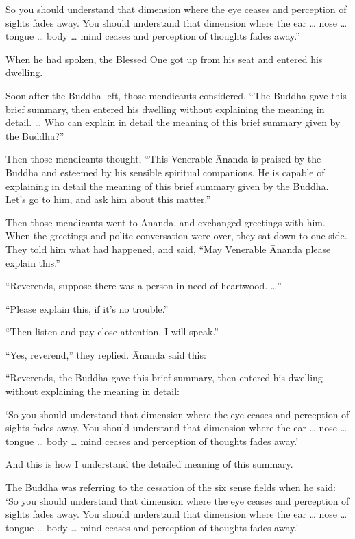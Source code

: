 \documentclass[12pt,openany]{book}%
\begin{document}
So you should understand that dimension where the eye ceases and perception of sights fades away. You should understand that dimension where the ear … nose … tongue … body … mind ceases and perception of thoughts fades away.” 

When he had spoken, the Blessed One got up from his seat and entered his dwelling. 

Soon after the Buddha left, those mendicants considered, “The Buddha gave this brief summary, then entered his dwelling without explaining the meaning in detail. … Who can explain in detail the meaning of this brief summary given by the Buddha?” 

Then those mendicants thought, “This Venerable Ānanda is praised by the Buddha and esteemed by his sensible spiritual companions. He is capable of explaining in detail the meaning of this brief summary given by the Buddha. Let’s go to him, and ask him about this matter.” 

Then those mendicants went to Ānanda, and exchanged greetings with him. When the greetings and polite conversation were over, they sat down to one side. They told him what had happened, and said, “May Venerable Ānanda please explain this.” 

“Reverends, suppose there was a person in need of heartwood. …” 

“Please explain this, if it’s no trouble.” 

“Then listen and pay close attention, I will speak.” 

“Yes, reverend,” they replied. Ānanda said this: 

“Reverends, the Buddha gave this brief summary, then entered his dwelling without explaining the meaning in detail: 

‘So you should understand that dimension where the eye ceases and perception of sights fades away. You should understand that dimension where the ear … nose … tongue … body … mind ceases and perception of thoughts fades away.’ 

And this is how I understand the detailed meaning of this summary. 

The Buddha was referring to the cessation of the six sense fields when he said: ‘So you should understand that dimension where the eye ceases and perception of sights fades away. You should understand that dimension where the ear … nose … tongue … body … mind ceases and perception of thoughts fades away.’ 
\end{document}
